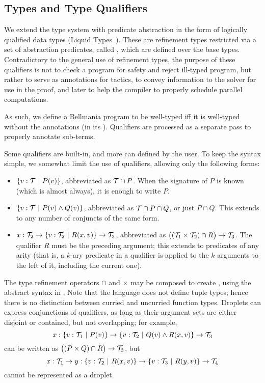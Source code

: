 \subsection{Types and Type Qualifiers}

We extend the type system with predicate abstraction in the form of logically qualified data types 
(Liquid Types~\cite{PLDI08/Rondon}). These are refinement types restricted via a set of abstraction predicates,
called , which are defined over the base types.
Contradictory to the general use of refinement types, the purpose of these qualifiers is not to
check a program for safety and reject ill-typed program, but rather to serve as annotations for
tactics, to convey information to the solver for use in the proof, and later to help the compiler
to properly schedule parallel computations.

As such, we define a Bellmania program to be well-typed iff it is well-typed
without the annotations (in its ). Qualifiers are processed
as a separate pass to properly annotate sub-terms.

Some qualifiers are built-in, and more can defined by the user. To keep the syntax simple, we somewhat
limit the use of qualifiers, allowing only the following forms:

\begin{itemize}
  \item $\{v:\mathcal{T} ~|~ P(v)\}$, abbreviated as $\mathcal{T}\cap P$. When the signature of $P$ is known (which is
  almost always), it is enough to write $P$.
  \item $\{v:\mathcal{T} ~|~ P(v)\land Q(v)\}$, abbreviated as $\mathcal{T}\cap P\cap Q$, or just $P\cap Q$. This extends
  to any number of conjuncts of the same form.
  \item $x : \mathcal{T}_2 \to \{v:\mathcal{T}_2 ~|~ R(x,v)\} \to \mathcal{T}_3$, abbreviated as $\big((\mathcal{T}_1\times\mathcal{T}_2)\cap R\big)\to\mathcal{T}_3$.
  The qualifier $R$ must be the preceding argument; this extends to predicates of
  any arity (that is, a $k$-ary predicate in a qualifier is applied to the $k$
  arguments to the left of it, including the current one).
\end{itemize}


\medskip  
The type refinement operators $\cap$ and $\times$ may be composed to create ,
using the abstract syntax in .
Note that the language does not define tuple types; hence there is no distinction between curried and uncurried function types.
Droplets can express conjunctions of qualifiers,
as long as their argument sets are either disjoint or contained, but not overlapping;
for example, \[x:\{v:\mathcal{T}_1~|~P(v)\}\to \{v:\mathcal{T}_2~|~Q(v)\land R(x,v)\}\to\mathcal{T}_3\] can be written as
$\big((P\times Q)\cap R\big)\to\mathcal{T}_3$, but \[x:\mathcal{T}_1\to y:\{v:\mathcal{T}_2~|~R(x,v)\} \to \{v:\mathcal{T}_3~|~R(y,v)\}\to\mathcal{T}_4\]
cannot be represented as a droplet.

